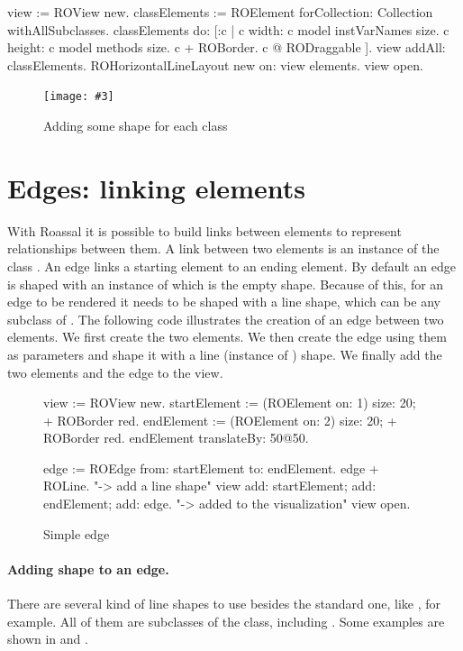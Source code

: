 \documentclass[a4paper,10pt,twoside]{book}
\newcommand{\fig}[4]{
		\begin{figure}[#1]
			\centering
			\texttt{[image: \#3]}
			\caption{\label{fig:#3}#4}
		\end{figure}}
\begin{document}
\begin{code}{}
view := ROView new.
classElements := ROElement forCollection: Collection withAllSubclasses.
classElements do: [:c | 
	c width: c model instVarNames size.
	c height: c model methods size.
	c + ROBorder. 
	c @ RODraggable ].
view addAll: classElements.
ROHorizontalLineLayout new on: view elements.
view open.
\end{code}

\fig{H}{0.6}{hier2}{Adding some shape for each class}


\section{Edges: linking elements} 

With Roassal it is possible to build links between elements to represent relationships between them. A link between two elements is an instance of the class . An edge links a starting element to an ending element. 
By default an edge is shaped with an instance of  which is the empty shape. Because of this, for an edge to be rendered it needs to be shaped with a line shape, which can be any subclass of .
The following code illustrates the creation of an edge between two elements. We first create the two elements. We then create the edge using them as parameters and shape it with a line (instance of ) shape. We finally add the two elements and the edge to the view.

\begin{figure}[H]
 \begin{code}{}
view := ROView new.
startElement := (ROElement on: 1) size: 20; + ROBorder red.
endElement := (ROElement on: 2)  size: 20; + ROBorder red.
endElement translateBy: 50@50.

edge := ROEdge from: startElement to: endElement.
edge + ROLine. "-> add a line shape"
view 
	add: startElement; 
	add: endElement; 
	add: edge. "-> added to the visualization"
view open.
\end{code}   
\caption{Simple edge}
\label{fig:simpleEdge}
\end{figure} 

\paragraph{Adding shape to an edge.}
There are several kind of line shapes to use besides the standard one, like , for example. All of them are subclasses of the  class, including . 
Some examples are shown in  and .
\end{document}
